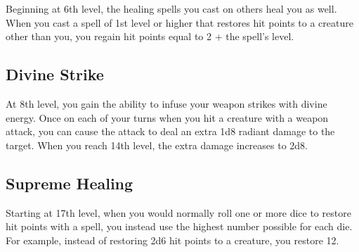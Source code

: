 Beginning at 6th level, the healing spells you cast on others heal you as well. When you cast a spell of 1st level or higher that restores hit points to a creature other than you, you regain hit points equal to 2 + the spell’s level.

\subsection{Divine Strike}

At 8th level, you gain the ability to infuse your weapon strikes with divine energy. Once on each of your turns when you hit a creature with a weapon attack, you can cause the attack to deal an extra 1d8 radiant damage to the target. When you reach 14th level, the extra damage increases to 2d8.

\subsection{Supreme Healing}

Starting at 17th level, when you would normally roll one or more dice to restore hit points with a spell, you instead use the highest number possible for each die. For example, instead of restoring 2d6 hit points to a creature, you restore 12.